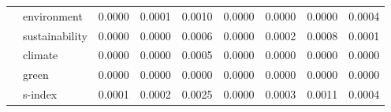 \begin{tabular}{llrrrrrrr}
              & environment &     0.0000 & 0.0001 &    0.0010 & 0.0000 & 0.0000 & 0.0000 & 0.0004 \\
              & sustainability &     0.0000 & 0.0000 &    0.0006 & 0.0000 & 0.0002 & 0.0008 & 0.0001 \\
              & climate &     0.0000 & 0.0000 &    0.0005 & 0.0000 & 0.0000 & 0.0000 & 0.0000 \\
              & green &     0.0000 & 0.0000 &    0.0000 & 0.0000 & 0.0000 & 0.0000 & 0.0000 \\
              & s-index &     0.0001 & 0.0002 &    0.0025 & 0.0000 & 0.0003 & 0.0011 & 0.0004 \\
\bottomrule
\end{tabular}
